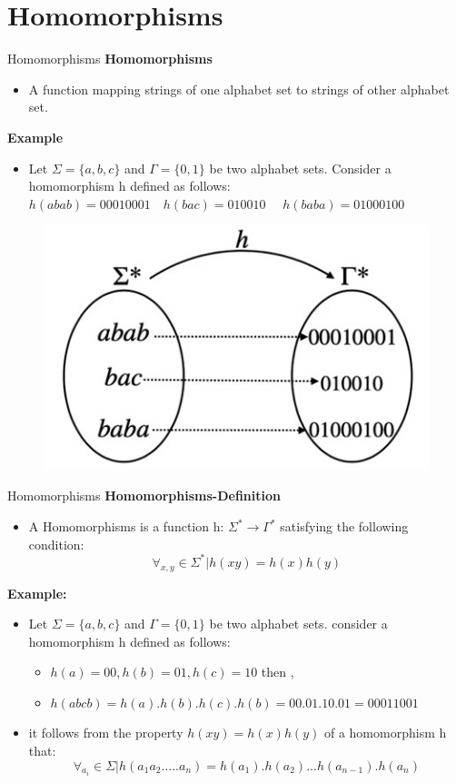 \documentclass{beamer}
\begin{document}
\section{Homomorphisms}
\begin{frame}{Homomorphisms}
	\textbf{Homomorphisms}
	\begin{itemize}
		\item A function mapping strings of one alphabet set to strings of other alphabet set.
	\end{itemize}
\textbf{Example}
\begin{itemize}
	\item Let $\Sigma = \{a,b,c\}$ and $\Gamma=\{0,1\}$ be two alphabet sets. Consider a homomorphism h defined as follows:\\
	$h(abab)=00010001$\ \ $h(bac)=010010$ \ \ $h(baba)=01000100$
	
\end{itemize}
	\begin{figure}
	\includegraphics[scale=.5]{img2/m27}
\end{figure}
 \end{frame}




\begin{frame}{Homomorphisms}
	\textbf{Homomorphisms-Definition}
	\begin{itemize}
		\item A Homomorphisms is a function h: $\Sigma^*\rightarrow \Gamma^*$ satisfying the following condition:
		$$\forall_{x,y} \in \Sigma^* \big | h(xy)= h(x)h(y)$$
	\end{itemize}
	\textbf{Example:}
	\begin{itemize}
		\item Let $\Sigma=\{a,b,c\}$ and $\Gamma=\{0,1\}$ be two alphabet sets. consider a homomorphism h defined as follows:
		\begin{itemize}
			\item $h(a)=00,h(b)=01,h(c)=10$ then ,
			\item $h(abcb)=h(a).h(b).h(c).h(b) = 00.01.10.01 = 00011001$
		\end{itemize}
	\item it follows from the property $h(xy)=h(x)h(y)$ of a homomorphism h that:
	$$\forall_{a_i} \in \Sigma \big | h(a_1a_2.....a_n)=h(a_1).h(a_2)...h(a_{n-1}).h(a_n)$$
	\end{itemize}
\end{frame}
\end{document}
